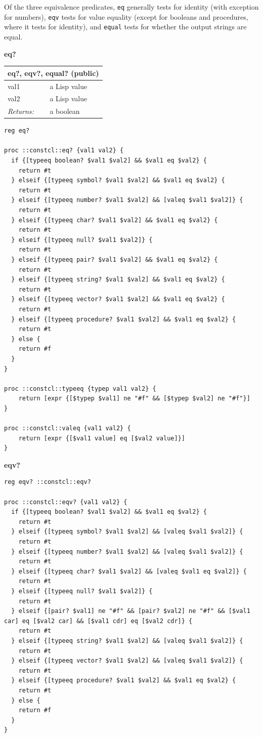 \documentclass[twoside,9pt]{report}
\begin{document}
Of the three equivalence predicates, \texttt{eq} generally tests for identity (with exception for numbers), \texttt{eqv} tests for value equality (except for booleans and procedures, where it tests for identity), and \texttt{equal} tests for whether the output strings are equal.


\textbf{eq?}

\begin{tabular}{ |l l| }
\hline
\multicolumn{2}{|l|}{eq?, eqv?, equal? (public)} \\
\hline
val1 & a Lisp value \\
val2 & a Lisp value \\
\textit{Returns:} & a boolean \\
\hline
\end{tabular}

\noindent\makebox[\linewidth]{\rule{\linewidth}{0.4pt}}
\begin{lstlisting}
reg eq?
 
proc ::constcl::eq? {val1 val2} {
  if {[typeeq boolean? $val1 $val2] && $val1 eq $val2} {
    return #t
  } elseif {[typeeq symbol? $val1 $val2] && $val1 eq $val2} {
    return #t
  } elseif {[typeeq number? $val1 $val2] && [valeq $val1 $val2]} {
    return #t
  } elseif {[typeeq char? $val1 $val2] && $val1 eq $val2} {
    return #t
  } elseif {[typeeq null? $val1 $val2]} {
    return #t
  } elseif {[typeeq pair? $val1 $val2] && $val1 eq $val2} {
    return #t
  } elseif {[typeeq string? $val1 $val2] && $val1 eq $val2} {
    return #t
  } elseif {[typeeq vector? $val1 $val2] && $val1 eq $val2} {
    return #t
  } elseif {[typeeq procedure? $val1 $val2] && $val1 eq $val2} {
    return #t
  } else {
    return #f
  }
}
 
proc ::constcl::typeeq {typep val1 val2} {
    return [expr {[$typep $val1] ne "#f" && [$typep $val2] ne "#f"}]
}
 
proc ::constcl::valeq {val1 val2} {
    return [expr {[$val1 value] eq [$val2 value]}]
}
\end{lstlisting}
\noindent\makebox[\linewidth]{\rule{\linewidth}{0.4pt}}

\textbf{eqv?}

\noindent\makebox[\linewidth]{\rule{\linewidth}{0.4pt}}
\begin{lstlisting}
reg eqv? ::constcl::eqv?
 
proc ::constcl::eqv? {val1 val2} {
  if {[typeeq boolean? $val1 $val2] && $val1 eq $val2} {
    return #t
  } elseif {[typeeq symbol? $val1 $val2] && [valeq $val1 $val2]} {
    return #t
  } elseif {[typeeq number? $val1 $val2] && [valeq $val1 $val2]} {
    return #t
  } elseif {[typeeq char? $val1 $val2] && [valeq $val1 eq $val2]} {
    return #t
  } elseif {[typeeq null? $val1 $val2]} {
    return #t
  } elseif {[pair? $val1] ne "#f" && [pair? $val2] ne "#f" && [$val1 car] eq [$val2 car] && [$val1 cdr] eq [$val2 cdr]} {
    return #t
  } elseif {[typeeq string? $val1 $val2] && [valeq $val1 $val2]} {
    return #t
  } elseif {[typeeq vector? $val1 $val2] && [valeq $val1 $val2]} {
    return #t
  } elseif {[typeeq procedure? $val1 $val2] && $val1 eq $val2} {
    return #t
  } else {
    return #f
  }
}
\end{lstlisting}
\noindent\makebox[\linewidth]{\rule{\linewidth}{0.4pt}}
\end{document}
